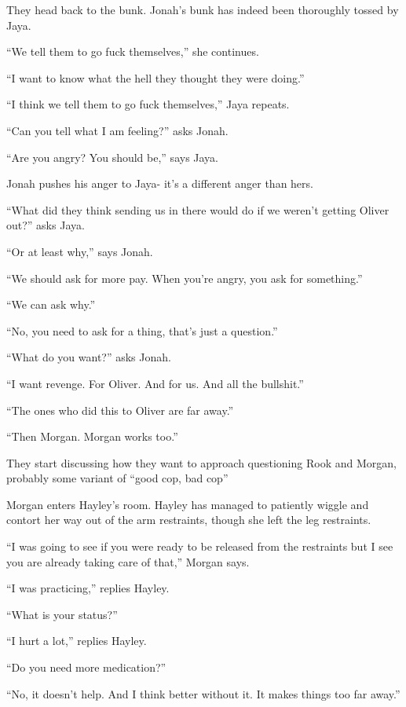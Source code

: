 They head back to the bunk.  Jonah's bunk has indeed been thoroughly tossed by Jaya.

``We tell them to go fuck themselves,'' she continues.

``I want to know what the hell they thought they were doing.''

``I think we tell them to go fuck themselves,'' Jaya repeats.

``Can you tell what I am feeling?'' asks Jonah.

``Are you angry?  You should be,'' says Jaya.

Jonah pushes his anger to Jaya- it's a different anger than hers.



``What did they think sending us in there would do if we weren't getting Oliver out?'' asks Jaya.

``Or at least why,'' says Jonah.

``We should ask for more pay.  When you're angry, you ask for something.''

``We can ask why.''

``No, you need to ask for a thing, that's just a question.''

``What do you want?'' asks Jonah.

``I want revenge. For Oliver.  And for us.  And all the bullshit.''

``The ones who did this to Oliver are far away.''

``Then Morgan.  Morgan works too.''



They start discussing how they want to approach questioning Rook and Morgan, probably some variant of ``good cop, bad cop''





Morgan enters Hayley's room.  Hayley has managed to patiently wiggle and contort her way out of the arm restraints, though she left the leg restraints.  

``I was going to see if you were ready to be released from the restraints but I see you are already taking care of that,'' Morgan says.

``I was practicing,'' replies Hayley.

``What is your status?'' 

``I hurt a lot,'' replies Hayley.

``Do you need more medication?''

``No, it doesn't help.  And I think better without it.  It makes things too far away.''

